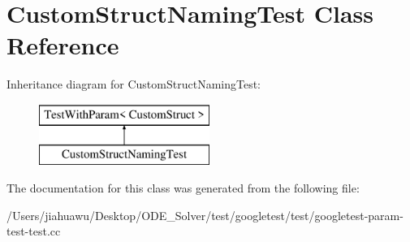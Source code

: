 \hypertarget{class_custom_struct_naming_test}{}\section{Custom\+Struct\+Naming\+Test Class Reference}
\label{class_custom_struct_naming_test}
Inheritance diagram for Custom\+Struct\+Naming\+Test\+:\begin{figure}[H]
\begin{center}
\leavevmode
\includegraphics[height=2.000000cm]{class_custom_struct_naming_test}
\end{center}
\end{figure}


The documentation for this class was generated from the following file\+:\begin{DoxyCompactItemize}
\item 
/\+Users/jiahuawu/\+Desktop/\+O\+D\+E\+\_\+\+Solver/test/googletest/test/googletest-\/param-\/test-\/test.\+cc\end{DoxyCompactItemize}

